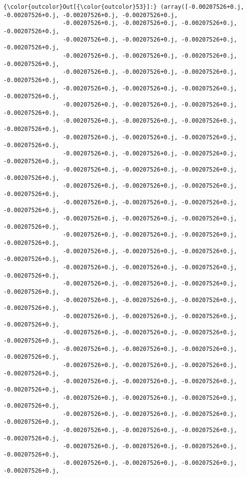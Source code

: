 \documentclass[11pt]{article}
\begin{document}
\begin{Verbatim}[commandchars=\\\{\}]
{\color{outcolor}Out[{\color{outcolor}53}]:} (array([-0.00207526+0.j, -0.00207526+0.j, -0.00207526+0.j, -0.00207526+0.j,
                 -0.00207526+0.j, -0.00207526+0.j, -0.00207526+0.j, -0.00207526+0.j,
                 -0.00207526+0.j, -0.00207526+0.j, -0.00207526+0.j, -0.00207526+0.j,
                 -0.00207526+0.j, -0.00207526+0.j, -0.00207526+0.j, -0.00207526+0.j,
                 -0.00207526+0.j, -0.00207526+0.j, -0.00207526+0.j, -0.00207526+0.j,
                 -0.00207526+0.j, -0.00207526+0.j, -0.00207526+0.j, -0.00207526+0.j,
                 -0.00207526+0.j, -0.00207526+0.j, -0.00207526+0.j, -0.00207526+0.j,
                 -0.00207526+0.j, -0.00207526+0.j, -0.00207526+0.j, -0.00207526+0.j,
                 -0.00207526+0.j, -0.00207526+0.j, -0.00207526+0.j, -0.00207526+0.j,
                 -0.00207526+0.j, -0.00207526+0.j, -0.00207526+0.j, -0.00207526+0.j,
                 -0.00207526+0.j, -0.00207526+0.j, -0.00207526+0.j, -0.00207526+0.j,
                 -0.00207526+0.j, -0.00207526+0.j, -0.00207526+0.j, -0.00207526+0.j,
                 -0.00207526+0.j, -0.00207526+0.j, -0.00207526+0.j, -0.00207526+0.j,
                 -0.00207526+0.j, -0.00207526+0.j, -0.00207526+0.j, -0.00207526+0.j,
                 -0.00207526+0.j, -0.00207526+0.j, -0.00207526+0.j, -0.00207526+0.j,
                 -0.00207526+0.j, -0.00207526+0.j, -0.00207526+0.j, -0.00207526+0.j,
                 -0.00207526+0.j, -0.00207526+0.j, -0.00207526+0.j, -0.00207526+0.j,
                 -0.00207526+0.j, -0.00207526+0.j, -0.00207526+0.j, -0.00207526+0.j,
                 -0.00207526+0.j, -0.00207526+0.j, -0.00207526+0.j, -0.00207526+0.j,
                 -0.00207526+0.j, -0.00207526+0.j, -0.00207526+0.j, -0.00207526+0.j,
                 -0.00207526+0.j, -0.00207526+0.j, -0.00207526+0.j, -0.00207526+0.j,
                 -0.00207526+0.j, -0.00207526+0.j, -0.00207526+0.j, -0.00207526+0.j,
                 -0.00207526+0.j, -0.00207526+0.j, -0.00207526+0.j, -0.00207526+0.j,
                 -0.00207526+0.j, -0.00207526+0.j, -0.00207526+0.j, -0.00207526+0.j,
                 -0.00207526+0.j, -0.00207526+0.j, -0.00207526+0.j, -0.00207526+0.j,
                 -0.00207526+0.j, -0.00207526+0.j, -0.00207526+0.j, -0.00207526+0.j,
                 -0.00207526+0.j, -0.00207526+0.j, -0.00207526+0.j, -0.00207526+0.j,
                 -0.00207526+0.j, -0.00207526+0.j, -0.00207526+0.j, -0.00207526+0.j,
                 -0.00207526+0.j, -0.00207526+0.j, -0.00207526+0.j, -0.00207526+0.j,

\end{Verbatim}
\end{document}

